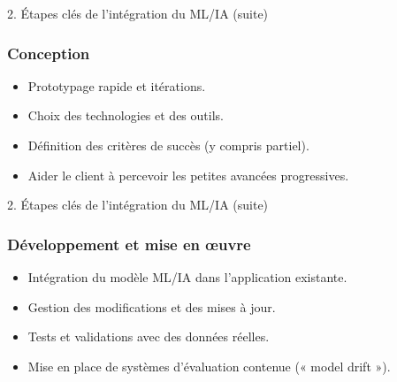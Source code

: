 \begin{frame}{2. Étapes clés de l'intégration du ML/IA (suite)}

  \subsubsection{Conception}
  \begin{itemize}
  \item Prototypage rapide et itérations.
  \item Choix des technologies et des outils.
  \item Définition des critères de succès (y compris partiel).
  \item Aider le client à percevoir les petites avancées progressives.
  \end{itemize}
\end{frame}

\begin{frame}{2. Étapes clés de l'intégration du ML/IA (suite)}

  \subsubsection{Développement et mise en œuvre}
  \begin{itemize}
  \item Intégration du modèle ML/IA dans l'application existante.
  \item Gestion des modifications et des mises à jour.
  \item Tests et validations avec des données réelles.
  \item Mise en place de systèmes d'évaluation contenue (« model drift »).
  \end{itemize}
\end{frame}

